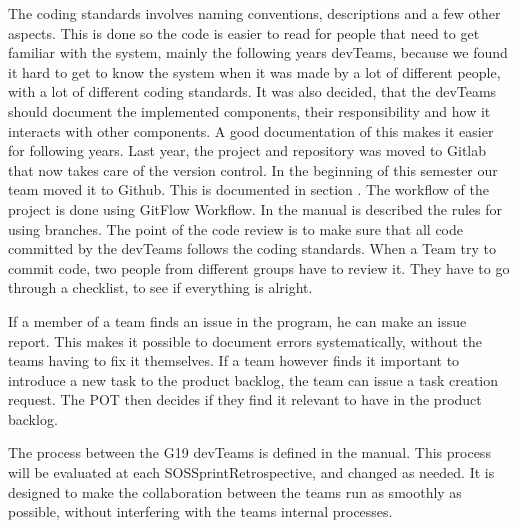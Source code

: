 The coding standards involves naming conventions, descriptions and a few other aspects. This is done so the code is easier to read for people that need to get familiar with the system, mainly the following years \glspl{devTeam}, because we found it hard to get to know the system when it was made by a lot of different people, with a lot of different coding standards.
It was also decided, that the \glspl{devTeam} should document the implemented components, their responsibility and how it interacts with other components. A good documentation of this makes it easier for following years. 
Last year, the project and repository was moved to Gitlab that now takes care of the version control. In the beginning of this semester our team moved it to Github. This is documented in section . The workflow of the project is done using GitFlow Workflow. In the manual is described the rules for using branches. 
The point of the code review is to make sure that all code committed by the \glspl{devTeam} follows the coding standards. When a Team try to commit code, two people from different groups have to review it. They have to go through a checklist, to see if everything is alright. 

If a member of a team finds an issue in the program, he can make an issue report. This makes it possible to document errors systematically, without the \glspl{team} having to fix it themselves. If a \gls{team} however finds it important to introduce a new task to the product backlog, the team can issue a task creation request. The \gls{POT} then decides if they find it relevant to have in the product backlog. 

The process between the \gls{G19} \glspl{devTeam} is defined in the manual. This process will be evaluated at each \gls{SOSSprintRetrospective}, and changed as needed. It is designed to make the collaboration between the \glspl{team} run as smoothly as possible, without interfering with the \glspl{team} internal processes.    